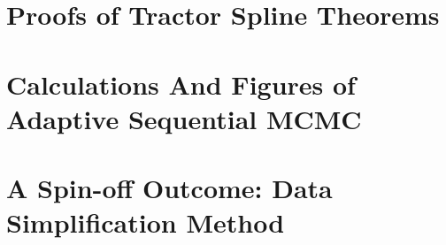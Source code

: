 \documentclass[12pt,twoside]{report}
\begin{document}


\begin{appendices}
\makeatletter
{}
\makeatother
 \chapter{Proofs of Tractor Spline Theorems}
 
 \chapter{Calculations And Figures of Adaptive Sequential MCMC}
  
 \chapter{A Spin-off Outcome: Data Simplification Method}
  
\end{appendices}



\clearemptydoublepage
\end{document}
